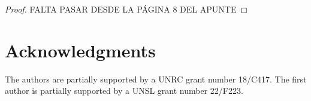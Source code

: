 \documentclass[twoside]{article}
\theoremstyle{remark}
\begin{document}
\begin{proof}
FALTA PASAR DESDE LA P\'AGINA 8 DEL APUNTE 


\end{proof}


\section*{Acknowledgments}
The authors are partially supported by a UNRC grant number 18/C417. The first author is  partially supported by a  UNSL grant number 22/F223. 




 
 
\end{document}
